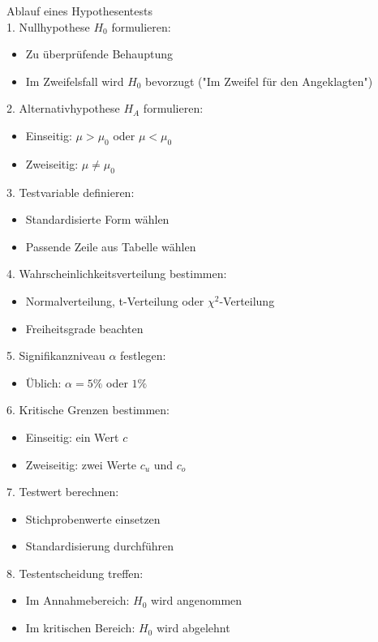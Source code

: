 \begin{KR}{Ablauf eines Hypothesentests}\\
1. Nullhypothese $H_0$ formulieren:
   \begin{itemize}
     \item Zu überprüfende Behauptung
     \item Im Zweifelsfall wird $H_0$ bevorzugt ("Im Zweifel für den Angeklagten")
   \end{itemize}

2. Alternativhypothese $H_A$ formulieren:
   \begin{itemize}
     \item Einseitig: $\mu > \mu_0$ oder $\mu < \mu_0$
     \item Zweiseitig: $\mu \neq \mu_0$
   \end{itemize}

3. Testvariable definieren:
   \begin{itemize}
     \item Standardisierte Form wählen
     \item Passende Zeile aus Tabelle wählen
   \end{itemize}

4. Wahrscheinlichkeitsverteilung bestimmen:
   \begin{itemize}
     \item Normalverteilung, t-Verteilung oder $\chi^2$-Verteilung
     \item Freiheitsgrade beachten
   \end{itemize}

5. Signifikanzniveau $\alpha$ festlegen:
   \begin{itemize}
     \item Üblich: $\alpha = 5\%$ oder $1\%$
   \end{itemize}

6. Kritische Grenzen bestimmen:
   \begin{itemize}
     \item Einseitig: ein Wert $c$
     \item Zweiseitig: zwei Werte $c_u$ und $c_o$
   \end{itemize}

7. Testwert berechnen:
   \begin{itemize}
     \item Stichprobenwerte einsetzen
     \item Standardisierung durchführen
   \end{itemize}

8. Testentscheidung treffen:
   \begin{itemize}
     \item Im Annahmebereich: $H_0$ wird angenommen
     \item Im kritischen Bereich: $H_0$ wird abgelehnt
   \end{itemize}
\end{KR}

